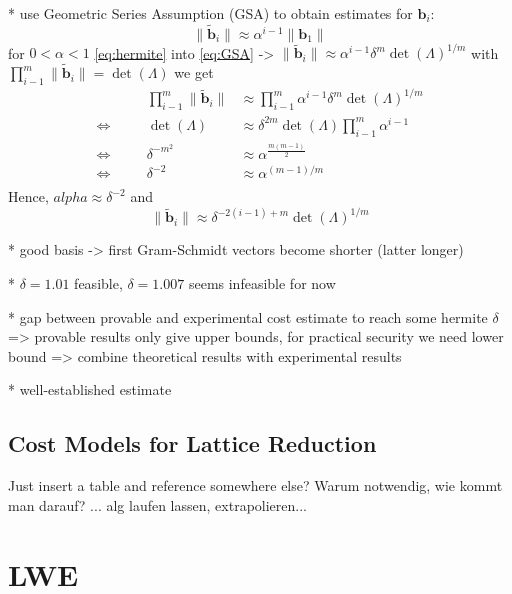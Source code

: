 \documentclass[
  a4paper,  %
  twoside,  %
  bibliography=totoc,
  headsepline,
  cleardoublepage=empty,
  parskip=half,
  draft=false
]{scrbook}
\begin{document}
  * use Geometric Series Assumption (GSA) to obtain estimates for $\textbf{b}_i$: %
    \begin{equation} \label{eq:GSA}
      \| \tilde{\textbf{b}}_i \| \approx \alpha^{i-1} \| \textbf{b}_1 \|
    \end{equation}
    for $0 < \alpha < 1$
    \ref{eq:hermite} into \ref{eq:GSA} -> $\| \tilde{\textbf{b}}_i \| \approx \alpha^{i-1} \delta^m \det(\Lambda)^{1/m}$
    with $\prod_{i-1}^m \| \tilde{\textbf{b}}_i \| = \det(\Lambda)$ we get 
    \begin{align*}
      &\quad& \prod_{i-1}^m \| \tilde{\textbf{b}}_i \| &\approx \prod_{i-1}^m \alpha^{i-1} \delta^m \det(\Lambda)^{1/m} \\
      \Leftrightarrow&\quad& \det(\Lambda) &\approx \delta^{2m} \det(\Lambda) \prod_{i-1}^m \alpha^{i-1}\\
      \Leftrightarrow&\quad& \delta^{-m^2}  &\approx \alpha^{\frac{m(m-1)}{2}}\\
      \Leftrightarrow&\quad& \delta^{-2}  &\approx \alpha^{(m-1)/m}\\
    \end{align*}
    Hence, $alpha \approx \delta^{-2}$ and 
    \begin{equation}
      \| \tilde{\textbf{b}}_i \| \approx \delta^{-2(i-1) + m} \det(\Lambda)^{1/m}
    \end{equation}

  * good basis -> first Gram-Schmidt vectors become shorter (latter longer)

  * $\delta = 1.01$ feasible, $\delta = 1.007$ seems infeasible for now

  * gap between provable and experimental cost estimate to reach some hermite $\delta$ => provable results only give upper bounds, for practical security we need lower bound => combine theoretical results with experimental results

  * well-established estimate \cite{LP11}




\subsection{Cost Models for Lattice Reduction}
Just insert a table and reference somewhere else? Warum notwendig, wie kommt man darauf? ... alg laufen lassen, extrapolieren...


\section{LWE}
\end{document}
